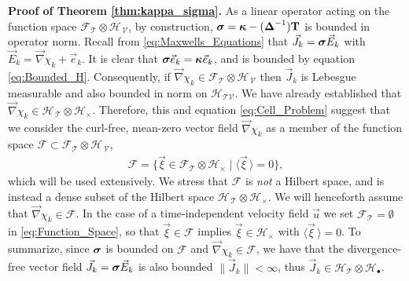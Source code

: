 \documentclass[11pt]{amsart}
\newcommand{\Tb}{\mathbf{T}}
\newcommand{\Tc}{\mathcal{T}}
\newcommand{\Vc}{\mathcal{V}}
\newcommand{\Hs}{\mathscr{H}}
\newcommand{\Fs}{\mathscr{F}}
\newcommand\bsig{\mbox{\boldmath${\sigma}$}}
\newcommand\bDelta{\mbox{\boldmath${\Delta}$}}
\newcommand\bkappa{\mbox{\boldmath${\kappa}$}}
\begin{document}
\textbf{Proof of Theorem \ref{thm:kappa_sigma}.}\hspace{1ex}
%
As a linear operator acting on the function space
$\Fs_{\Tc}\otimes\Hs_{\,\Vc}$, by construction,
$\bsig=\bkappa-(\bDelta^{-1})\Tb$ is bounded in operator norm. Recall
from \eqref{eq:Maxwells_Equations} that $\vec{J}_k=\bsig\vec{E}_k$
with $\vec{E}_k=\vec{\nabla}\chi_k+\vec{e}_k$. It is clear that
$\bsig\vec{e}_k=\bkappa\vec{e}_k$, and is bounded by equation
\eqref{eq:Bounded_H}. Consequently, if
$\vec{\nabla}\chi_k\in\Fs_{\Tc}\otimes\Hs_{\,\Vc}$ then  
$\vec{J}_k$ is Lebesgue measurable and also bounded in norm on 
$\Hs_{\Tc\Vc}$. We have already established that 
$\vec{\nabla}\chi_k\in\Hs_{\,\Tc}\otimes\Hs_\times$. Therefore, this and equation
\eqref{eq:Cell_Problem} suggest that we consider the curl-free,
mean-zero vector field $\vec{\nabla}\chi_k$ as a member of the function space
$\Fs\subset\Fs_{\Tc}\otimes\Hs_{\,\Vc}$,         
%
\begin{align}\label{eq:Function_Space}
  \Fs=\{\vec{\xi}\in\Fs_{\Tc}\otimes\Hs_\times \;|\; \langle\vec{\xi}\,\rangle=0\},  
\end{align}
%
which will be used extensively. We
stress that $\Fs$ is \emph{not} a Hilbert space, and is instead a
dense subset of the Hilbert space $\Hs_{\,\Tc}\otimes\Hs_\times$. We will
henceforth assume that $\vec{\nabla}\chi_k\in\Fs$. In the case of a
time-independent velocity field $\vec{u}$ we set $\Fs_{\Tc}=\emptyset$ in 
\eqref{eq:Function_Space}, so that $\vec{\xi}\in\Fs$ implies 
$\vec{\xi}\in\Hs_\times$ with $\langle\vec{\xi}\,\rangle=0$. To summarize, since $\bsig$ is
bounded on $\Fs$ and $\vec{\nabla}\chi_k\in\Fs$, we have that the
divergence-free vector field $\vec{J}_k=\bsig\vec{E}_k$ is also
bounded $\|\vec{J}_k\|<\infty$, thus $\vec{J}_k\in\Hs_{\Tc}\otimes\Hs_\bullet$.  
\end{document}

